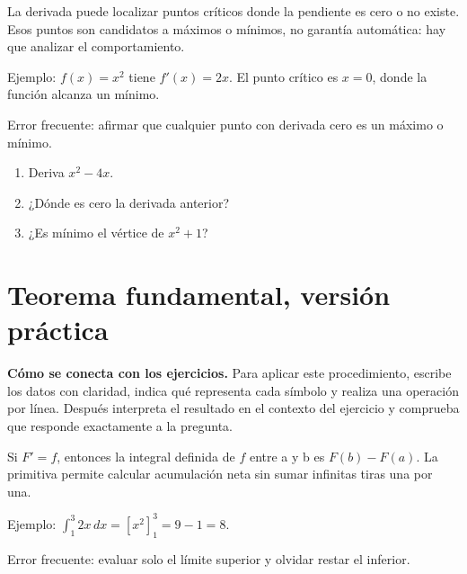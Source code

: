 \documentclass[10pt,oneside,openany]{book}
\begin{document}
La derivada puede localizar puntos críticos donde la pendiente es cero o no existe. Esos puntos son candidatos a máximos o mínimos, no garantía automática: hay que analizar el comportamiento.

\begin{ejemplo}
Ejemplo: $f(x)=x^2$ tiene $f'(x)=2x$. El punto crítico es $x=0$, donde la función alcanza un mínimo.
\end{ejemplo}

\begin{ojo}
Error frecuente: afirmar que cualquier punto con derivada cero es un máximo o mínimo.
\end{ojo}

\begin{practica}

\begin{enumerate}

\item Deriva $x^2-4x$.

\item ¿Dónde es cero la derivada anterior?

\item ¿Es mínimo el vértice de $x^2+1$?

\end{enumerate}

\end{practica}



\section{Teorema fundamental, versión práctica}

\textbf{Cómo se conecta con los ejercicios.} Para aplicar este procedimiento, escribe los datos con claridad, indica qué representa cada símbolo y realiza una operación por línea. Después interpreta el resultado en el contexto del ejercicio y comprueba que responde exactamente a la pregunta.

Si $F'=f$, entonces la integral definida de $f$ entre a y b es $F(b)-F(a)$. La primitiva permite calcular acumulación neta sin sumar infinitas tiras una por una.

\begin{ejemplo}
Ejemplo: $\int_1^3 2x\,dx=[x^2]_1^3=9-1=8$.
\end{ejemplo}

\begin{ojo}
Error frecuente: evaluar solo el límite superior y olvidar restar el inferior.
\end{ojo}
\end{document}
